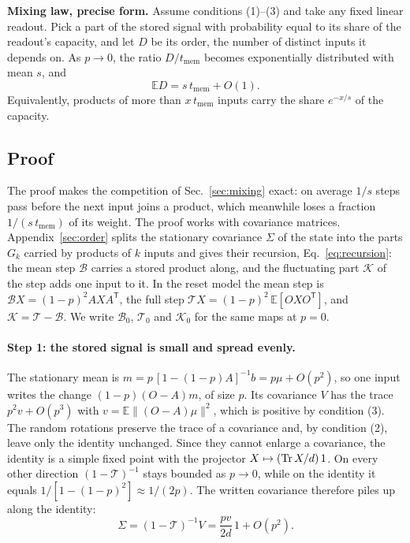 \begin{keybox}
\textbf{Mixing law, precise form.} Assume conditions (1)--(3) and take any fixed linear readout. Pick a part of
the stored signal with probability equal to its share of the readout's capacity, and let $D$ be its order, the number
of distinct inputs it depends on. As $p\to0$, the ratio
$D/t_{\mathrm{mem}}$ becomes exponentially distributed with mean $s$, and
\[\mathbb ED=s\,t_{\mathrm{mem}}+O(1).\]
Equivalently, products of more than $x\,t_{\mathrm{mem}}$ inputs carry the share $e^{-x/s}$ of the capacity.
\end{keybox}

\subsection{Proof}
\label{app:proof}
The proof makes the competition of Sec.~\ref{sec:mixing} exact: on average $1/s$ steps pass before the next input joins a
product, which meanwhile loses a fraction $1/(s\,t_{\mathrm{mem}})$ of its weight.
The proof works with covariance matrices. Appendix~\ref{sec:order} splits the stationary covariance $\Sigma$ of the state into the
parts $G_k$ carried by products of $k$ inputs and gives their recursion, Eq.~\eqref{eq:recursion}: the mean step
$\mathcal B$ carries a stored product along, and the fluctuating part $\mathcal K$ of the step adds one input to it.
In the reset model the mean step is $\mathcal BX=(1-p)^2AXA^{\mathsf T}$, the full step
$\mathcal TX=(1-p)^2\,\mathbb E[OXO^{\mathsf T}]$, and $\mathcal K=\mathcal T-\mathcal B$. We write $\mathcal B_0$,
$\mathcal T_0$ and $\mathcal K_0$ for the same maps at $p=0$.

\paragraph{Step 1: the stored signal is small and spread evenly.}
The stationary mean is $m=p\,[1-(1-p)A]^{-1}b=p\mu+O(p^2)$, so one input writes the change $(1-p)(O-A)m$, of size
$p$. Its covariance $V$ has the trace $p^2v+O(p^3)$ with $v=\mathbb E\|(O-A)\mu\|^2$, which is positive by
condition (3). The random rotations preserve the trace of a covariance and, by condition (2), leave only the identity unchanged. Since they cannot enlarge a covariance, the identity is a simple fixed point with the projector
$X\mapsto(\operatorname{Tr} X/d)\,1$. On every other direction $(1-\mathcal T)^{-1}$ stays bounded as $p\to0$, while on the identity
it equals $1/[1-(1-p)^2]\approx1/(2p)$. The written covariance therefore piles up along the identity:
\begin{equation}
  \Sigma=(1-\mathcal T)^{-1}V=\frac{pv}{2d}\,1+O(p^2).
  \label{eq:slowcov}
\end{equation}

